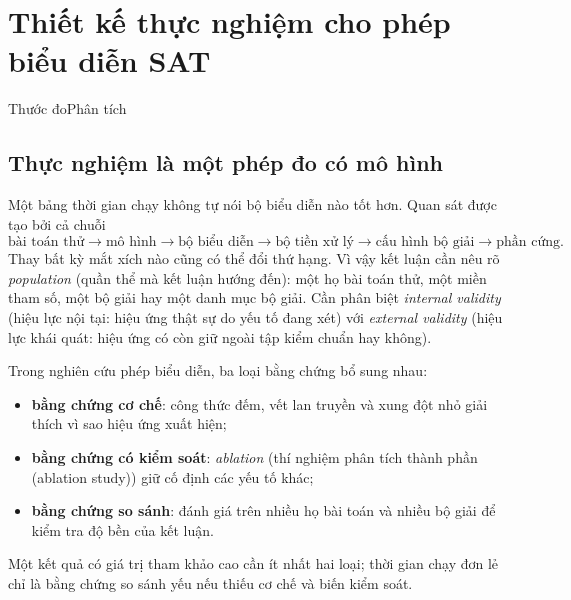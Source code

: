 \chapter{Thiết kế thực nghiệm cho phép biểu diễn SAT}


  {Thước đo}{Phân tích}

\section{Thực nghiệm là một phép đo có mô hình}

Một bảng thời gian chạy không tự nói bộ biểu diễn nào tốt hơn. Quan sát được tạo
bởi cả
chuỗi
\[
  \text{bài toán thử}
  \rightarrow\text{mô hình}
  \rightarrow\text{bộ biểu diễn}
  \rightarrow\text{bộ tiền xử lý}
  \rightarrow\text{cấu hình bộ giải}
  \rightarrow\text{phần cứng}.
\]
Thay bất kỳ mắt xích nào cũng có thể đổi thứ hạng. Vì vậy kết luận cần nêu rõ
\emph{population} (quần thể mà kết luận hướng đến): một họ bài toán thử, một
miền tham số, một bộ giải hay một danh mục bộ giải. Cần phân biệt
\emph{internal validity} (hiệu lực nội tại: hiệu ứng thật sự do yếu tố
đang xét) với \emph{external validity} (hiệu lực khái quát: hiệu ứng
có còn giữ ngoài tập kiểm chuẩn hay không).

Trong nghiên cứu phép biểu diễn, ba loại bằng chứng bổ sung nhau:
\begin{itemize}
  \item \textbf{bằng chứng cơ chế}: công thức đếm, vết lan truyền và xung đột
        nhỏ giải thích vì sao hiệu ứng xuất hiện;
  \item \textbf{bằng chứng có kiểm soát}: \emph{ablation}
        (thí nghiệm phân tích thành phần (ablation study)) giữ cố định các yếu tố khác;
  \item \textbf{bằng chứng so sánh}: đánh giá trên nhiều họ bài toán và nhiều
        bộ giải để kiểm tra độ bền của kết luận.
\end{itemize}
Một kết quả có giá trị tham khảo cao cần ít nhất hai loại; thời gian chạy đơn
lẻ chỉ là bằng chứng so sánh yếu nếu thiếu cơ chế và biến kiểm soát.

